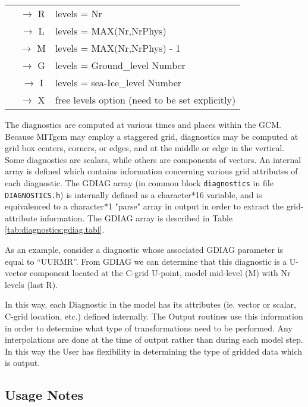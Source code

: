 \begin{table}
\begin{center}
\begin{tabular}{ |c|c|l| }
           & $\rightarrow$ R &  levels = Nr  \\
           & $\rightarrow$ L &  levels = MAX(Nr,NrPhys)  \\
           & $\rightarrow$ M &  levels = MAX(Nr,NrPhys) - 1  \\
           & $\rightarrow$ G &  levels = Ground\_level Number \\
           & $\rightarrow$ I &  levels = sea-Ice\_level Number \\
           & $\rightarrow$ X &  free levels option (need to be set explicitly)\\ \hline
\end{tabular}
\end{center}
\end{table}

\noindent
The diagnostics are computed at various times and places within the
GCM. Because MITgcm may employ a staggered grid, diagnostics may be
computed at grid box centers, corners, or edges, and at the middle or
edge in the vertical. Some diagnostics are scalars, while others are
components of vectors. An internal array is defined which contains
information concerning various grid attributes of each diagnostic. The
GDIAG array (in common block {\tt diagnostics} in file {\tt
  DIAGNOSTICS.h}) is internally defined as a character*16 variable, and
is equivalenced to a character*1 "parse" array in output in order to
extract the grid-attribute information.  The GDIAG array is described
in Table \ref{tab:diagnostics:gdiag.tabl}.

\noindent
As an example, consider a diagnostic whose associated GDIAG parameter is equal
to ``UUR\hspace{5mm}MR''.  From GDIAG we can determine that this diagnostic is a
U-vector component located at the C-grid U-point, model mid-level (M)
with Nr levels (last R).

\noindent
In this way, each Diagnostic in the model has its attributes (ie. vector or scalar,
C-grid location, etc.) defined internally.  The Output routines use this information
in order to determine what type of transformations need to be performed.  Any
interpolations are done at the time of output rather than during each model step.
In this way the User has flexibility in determining the type of gridded data which
is output.

\subsection{Usage Notes}
\label{sec:diagnostics:usersguide}

